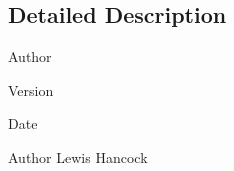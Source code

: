 \subsection{Detailed Description}
\begin{DoxyAuthor}{Author}

\end{DoxyAuthor}
\begin{DoxyVersion}{Version}

\end{DoxyVersion}
\begin{DoxyDate}{Date}

\end{DoxyDate}
\begin{DoxyAuthor}{Author}
Lewis Hancock 
\end{DoxyAuthor}
